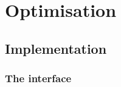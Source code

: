 


\chapter{Optimisation}
\label{ch: optimisation}




\section{Implementation}




\subsection{The interface}

